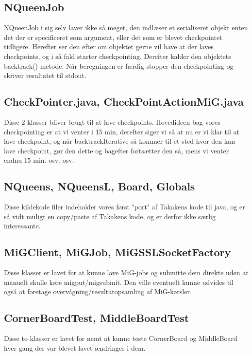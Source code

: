 \documentclass[draft,a4paper,11pt]{article}
\newcommand{\mig}{MiG}
\begin{document}
\subsection{NQueenJob}

NQueenJob i sig selv laver ikke så meget, den indlæser et serialiseret objekt
enten det der er specificeret som argument, eller det som er blevet checkpointet
tidligere. Herefter ser den efter om objektet gerne vil have at der laves
checkpoints, og i så fald starter checkpointing. Derefter kalder den objektets
backtrack() metode. Når beregningen er færdig stopper den checkpointing og
skriver resultatet til stdout.

\subsection{CheckPointer.java, CheckPointActionMiG.java}

Disse 2 klasser bliver brugt til at lave checkpoints. Hovedideen bag vores
checkpointing er at vi venter i 15 min, derefter siger vi så at nu er vi klar
til at lave checkpoint, og når backtrackIterative så kommer til et sted hvor den
kan lave checkpoint, gør den dette og bagefter fortsætter den så, mens vi venter
endnu 15 min. osv. osv. 

\subsection{NQueens, NQueensL, Board, Globals}

Disse kildekode filer indeholder vores først "port" af Takakens kode til java,
og er så vidt muligt en copy/paste af Takakens kode, og er derfor ikke særlig
interessante. 

\subsection{MiGClient, MiGJob, MiGSSLSocketFactory}

Disse klasser er lavet for at kunne lave \mig-jobs og submitte dem direkte uden
at manuelt skulle køre migput/migsubmit. Den ville eventuelt kunne udvides til
også at foretage overvågning/resultatopsamling af \mig-kørsler.

\subsection{CornerBoardTest, MiddleBoardTest}

Disse to klasser er lavet for nemt at kunne teste CornerBoard og MiddleBoard
hver gang der var blevet lavet ændringer i dem. 
\end{document}
